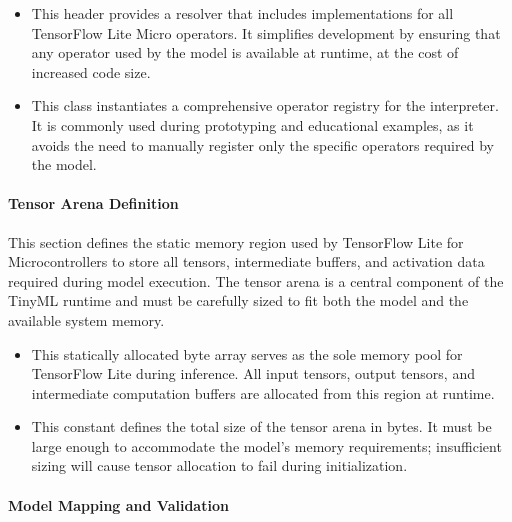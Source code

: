 \begin{itemize}
	\item {} 
	
	This header provides a resolver that includes implementations for all TensorFlow Lite Micro operators. It simplifies development by ensuring that any operator used by the model is available at runtime, at the cost of increased code size.
	
	\item {} 
	
	This class instantiates a comprehensive operator registry for the interpreter. It is commonly used during prototyping and educational examples, as it avoids the need to manually register only the specific operators required by the model.
\end{itemize}


\paragraph{Tensor Arena Definition}

This section defines the static memory region used by TensorFlow Lite for Microcontrollers to store all tensors, intermediate buffers, and activation data required during model execution. The tensor arena is a central component of the TinyML runtime and must be carefully sized to fit both the model and the available system memory.

\begin{itemize}
	\item {} 
	
	This statically allocated byte array serves as the sole memory pool for TensorFlow Lite during inference. All input tensors, output tensors, and intermediate computation buffers are allocated from this region at runtime.
	
	\item {} 
	
	This constant defines the total size of the tensor arena in bytes. It must be large enough to accommodate the model’s memory requirements; insufficient sizing will cause tensor allocation to fail during initialization.
\end{itemize}


\paragraph{Model Mapping and Validation}

